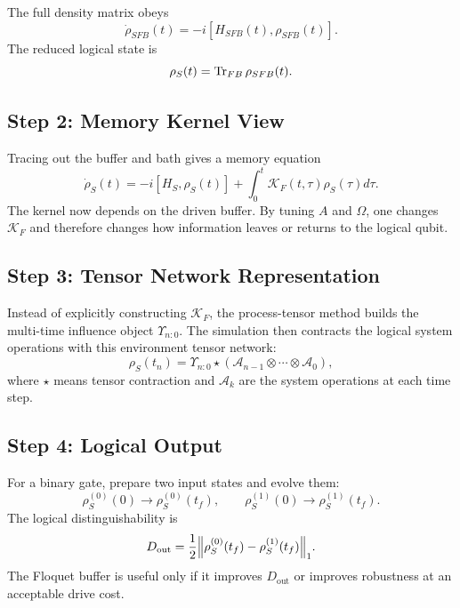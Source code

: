 \documentclass[11pt]{article}
\begin{document}
The full density matrix obeys
\begin{equation}
    \dot{\rho}_{SFB}(t)
    =
    -i[H_{SFB}(t),\rho_{SFB}(t)].
\end{equation}
The reduced logical state is
\begin{equation}
    \rho_S(t)
    =
    \Tr_{FB}\rho_{SFB}(t).
\end{equation}

\subsection*{Step 2: Memory Kernel View}

Tracing out the buffer and bath gives a memory equation
\begin{equation}
    \dot{\rho}_S(t)
    =
    -i[H_S,\rho_S(t)]
    +
    \int_0^t
    \mathcal{K}_F(t,\tau)\rho_S(\tau)d\tau.
\end{equation}
The kernel now depends on the driven buffer.  By tuning $A$ and $\Omega$, one changes
$\mathcal{K}_F$ and therefore changes how information leaves or returns to the logical qubit.

\subsection*{Step 3: Tensor Network Representation}

Instead of explicitly constructing $\mathcal{K}_F$, the process-tensor method builds the
multi-time influence object $\Upsilon_{n:0}$.  The simulation then contracts the logical system
operations with this environment tensor network:
\begin{equation}
    \rho_S(t_n)
    =
    \Upsilon_{n:0}
    \star
    \left(
        \mathcal{A}_{n-1}
        \otimes
        \cdots
        \otimes
        \mathcal{A}_0
    \right),
\end{equation}
where $\star$ means tensor contraction and $\mathcal{A}_k$ are the system operations at each
time step.

\subsection*{Step 4: Logical Output}

For a binary gate, prepare two input states and evolve them:
\begin{equation}
    \rho_S^{(0)}(0)
    \rightarrow
    \rho_S^{(0)}(t_f),
    \qquad
    \rho_S^{(1)}(0)
    \rightarrow
    \rho_S^{(1)}(t_f).
\end{equation}
The logical distinguishability is
\begin{equation}
    D_{\mathrm{out}}
    =
    \frac{1}{2}
    \norm{
        \rho_S^{(0)}(t_f)
        -
        \rho_S^{(1)}(t_f)
    }_1.
\end{equation}
The Floquet buffer is useful only if it improves $D_{\mathrm{out}}$ or improves robustness at an
acceptable drive cost.
\end{document}

